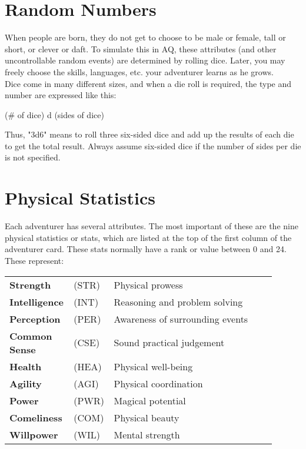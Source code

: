 \begin{multicols}{2}
\section{Random Numbers}
When people are born, they do not get to choose to be male or female, tall or short, or clever or daft. To simulate this in AQ, these attributes (and other uncontrollable random events) are determined by rolling dice. Later, you may freely choose the skills, languages, etc. your adventurer learns as he grows.\\
Dice come in many different sizes, and when a die roll is required, the type and number are expressed like this:\\
\begin{center}
(\# of dice) d (sides of dice)
\end{center}
Thus, "3d6" means to roll three six-sided dice and add up the results of each die to get the total result. Always assume six-sided dice if the number of sides per die is not specified.
\section{Physical Statistics}
Each adventurer has several attributes. The most important of these are the nine physical statistics or stats, which are listed at the top of the first column of the adventurer card. These stats normally have a rank or value between 0 and 24. These represent:

\begin{tabular}{p{0.2\linewidth} p{0.1\linewidth} p{0.6\linewidth}}
\textbf{Strength} & (STR) & Physical prowess\\
\textbf{Intelligence} & (INT) & Reasoning and problem solving\\
\textbf{Perception} & (PER) & Awareness of surrounding events\\
\textbf{Common Sense} & (CSE) & Sound practical judgement\\
\textbf{Health} & (HEA) & Physical well-being\\
\textbf{Agility} & (AGI) & Physical coordination\\
\textbf{Power} &  (PWR) &  Magical potential\\
\textbf{Comeliness} & (COM) & Physical beauty\\
\textbf{Willpower} & (WIL) & Mental strength\\
\end{tabular}


\end{multicols}
